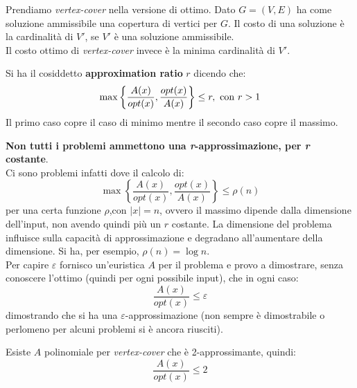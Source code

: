 												\begin{esempio}
													Prendiamo \textit{vertex-cover} nella versione di ottimo. Dato $G=(V,E)$ ha
													come soluzione ammissibile una copertura di vertici per $G$. Il costo di una
													soluzione è la cardinalità di $V'$, se $V'$ è una soluzione ammissibile.\\
													Il costo ottimo di \textit{vertex-cover} invece è la minima cardinalità di
													$V'$.
												\end{esempio}
												\begin{definizione}
													Si ha il cosiddetto \textbf{approximation ratio} $r$ dicendo che:
													\[\max\left\{\frac{A(x)}{opt(x)},\frac{opt(x)}{A(x)}\right\}\leq r,\mbox{
															\textnormal{con} }r>1\] 
														Il primo caso copre il caso di minimo mentre il secondo caso copre il massimo.
														\end{definizione}
														\textbf{Non tutti i problemi ammettono una \textit{r}-approssimazione, per
															\textit{r} costante}.\\
														Ci sono problemi infatti dove il calcolo di:
														\[\max\left\{\frac{A(x)}{opt(x)},\frac{opt(x)}{A(x)}\right\}\leq \rho(n)\]
														per una certa funzione $\rho$,con $|x|=n$,
														ovvero il massimo dipende dalla
														dimensione dell'input, non avendo quindi più un $r$ costante. La dimensione del
														problema influisce sulla capacità di approssimazione e degradano all'aumentare
														della dimensione. Si ha, per esempio, $\rho(n)=\log n$.\\
														Per capire $\varepsilon$ fornisco un'euristica $A$ per il problema e provo a
														dimostrare, senza conoscere l'ottimo (quindi per ogni possibile input), che in
														ogni caso:
														\[\frac{A(x)}{opt(x)}\leq \varepsilon\]
														dimostrando che si ha una $\varepsilon$-approssimazione (non sempre è
														dimostrabile o perlomeno per alcuni problemi si è ancora riusciti).
														\begin{teorema}
															Esiste $A$ polinomiale per \textit{vertex-cover} che è 2-approssimante,
															quindi:
															\[\frac{A(x)}{opt(x)}\leq 2\]
														\end{teorema}
